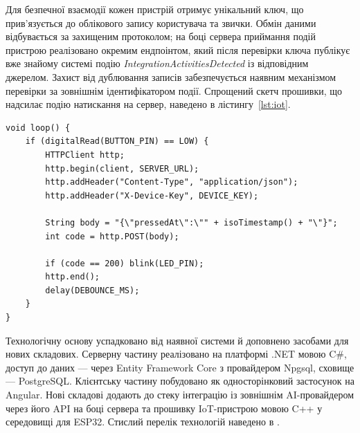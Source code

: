 Для безпечної взаємодії кожен пристрій отримує унікальний ключ, що прив'язується до облікового
запису користувача та звички.
Обмін даними відбувається за захищеним протоколом; на боці сервера приймання подій пристрою
реалізовано окремим ендпоінтом, який після перевірки ключа публікує вже знайому системі подію
\textit{IntegrationActivitiesDetected} із відповідним джерелом.
Захист від дублювання записів забезпечується наявним механізмом перевірки за зовнішнім
ідентифікатором події.
Спрощений скетч прошивки, що надсилає подію натискання на сервер, наведено в лістингу~\ref{lst:iot}.

\begin{lstlisting}[style=nocodeframe, language=ArduinoCpp, caption={Надсилання події натискання кнопки з пристрою ESP32}, label={lst:iot}]
void loop() {
    if (digitalRead(BUTTON_PIN) == LOW) {
        HTTPClient http;
        http.begin(client, SERVER_URL);
        http.addHeader("Content-Type", "application/json");
        http.addHeader("X-Device-Key", DEVICE_KEY);

        String body = "{\"pressedAt\":\"" + isoTimestamp() + "\"}";
        int code = http.POST(body);

        if (code == 200) blink(LED_PIN);
        http.end();
        delay(DEBOUNCE_MS);
    }
}
\end{lstlisting}


Технологічну основу успадковано від наявної системи й доповнено засобами для нових складових.
Серверну частину реалізовано на платформі .NET мовою C\#, доступ до даних — через Entity
Framework Core з провайдером Npgsql, сховище — PostgreSQL.
Клієнтську частину побудовано як односторінковий застосунок на Angular.
Нові складові додають до стеку інтеграцію із зовнішнім AI-провайдером через його API на боці
сервера та прошивку IoT-пристрою мовою C++ у середовищі для ESP32.
Стислий перелік технологій наведено в .

